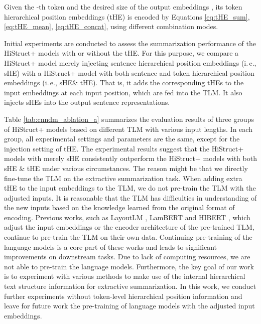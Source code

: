\documentclass[11pt]{article}
\begin{document}
Given the -th token and the desired size of the output embeddings , its token hierarchical position embeddings (tHE) is encoded by Equations \ref{eq:tHE_sum}, \ref{eq:tHE_mean}, \ref{eq:tHE_concat}, using different combination modes.




Initial experiments are conducted to assess the summarization performance of the HiStruct+ models with or without the tHE. For this purpose, we compare a HiStruct+ model merely injecting sentence hierarchical position embeddings (i.\,e., sHE) with a HiStruct+ model with both sentence and token hierarchical position embeddings (i.\,e., sHE\& tHE). That is, it adds the corresponding tHEs to the input embeddings at each input position, which are fed into the TLM. It also injects sHEs into the output sentence representations.
 

Table \ref{tab:cnndm_ablation_a} summarizes the evaluation results of three groups of HiStruct+ models based on different TLM with various input lengths. In each group, all experimental settings and parameters are the same, except for the injection setting of tHE.
The experimental results suggest that the HiStruct+ models with merely sHE consistently outperform the HiStruct+ models with both sHE \& tHE under various circumstances. The reason might be that we directly fine-tune the TLM on the extractive summarization task. When adding extra tHE to the input embeddings to the TLM, we do not pre-train the TLM with the adjusted inputs. It is reasonable that the TLM has difficulties in understanding of the new inputs based on the knowledge learned from the original format of encoding. Previous works, such as LayoutLM \cite{layoutlm}, LamBERT \cite{lambert} and HIBERT \cite{zhang-etal-2019-hibert},  which adjust the input embeddings or the encoder architecture of the pre-trained TLM, continue to pre-train the TLM on their own data. Continuing pre-training of the language models is a core part of these works and leads to significant improvements on downstream tasks. Due to lack of computing resources, we are not able to pre-train the language models. Furthermore, the key goal of our work is to experiment with various methods to make use of the internal hierarchical text structure information for extractive summarization. In this work, we conduct further experiments without token-level hierarchical position information and leave for future work the pre-training of language models with the adjusted input embeddings.
\end{document}
